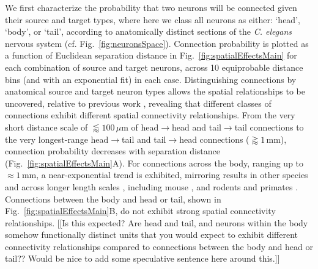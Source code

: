 \documentclass[10pt,letterpaper]{article}
\begin{document}
We first characterize the probability that two neurons will be connected given their source and target types, where here we class all neurons as either: `head', `body', or `tail', according to anatomically distinct sections of the \emph{C. elegans} nervous system (cf. Fig.~\ref{fig:neuronsSpace}).
Connection probability is plotted as a function of Euclidean separation distance in Fig.~\ref{fig:spatialEffectsMain} for each combination of source and target neurons, across 10 equiprobable distance bins (and with an exponential fit) in each case.
Distinguishing connections by anatomical source and target neuron types allows the spatial relationships to be uncovered, relative to previous work \cite{Azulay:2016cg}, revealing that different classes of connections exhibit different spatial connectivity relationships.
From the very short distance scale of $\lessapprox 100\,\mu$m of head$\rightarrow$head and tail$\rightarrow$tail connections to the very longest-range head$\rightarrow$tail and tail$\rightarrow$head connections ($\gtrapprox 1\,$mm), connection probability decreases with separation distance (Fig.~\ref{fig:spatialEffectsMain}A).
For connections across the body, ranging up to $\approx 1$\,mm, a near-exponential trend is exhibited, mirroring results in other species and across longer length scales \cite{Wang:2016gg}, including mouse \cite{Goulas:2016hr, Fulcher:2016ck}, and rodents and primates \cite{Horvat:2016ia}.
Connections between the body and head or tail, shown in Fig.~\ref{fig:spatialEffectsMain}B, do not exhibit strong spatial connectivity relationships.
[[Is this expected? Are head and tail, and neurons within the body somehow functionally distinct units that you would expect to exhibit different connectivity relationships compared to connections between the body and head or tail?? Would be nice to add some speculative sentence here around this.]]
\end{document}

